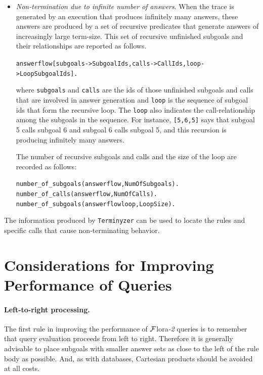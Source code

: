 \documentclass[11pt]{article}
\newcommand{\FLORA}{{\mbox{\sc ${\cal F}${lora}\rm\emph{-2}}}\xspace}
\newcommand{\FLSYSTEM}{\FLORA}
\begin{document}
{\begin{itemize}
\item \emph{Non-termination due to infinite number of answers}. 
  When the trace is generated by an execution that produces
  infinitely many answers, these answers are produced by a set of
  recursive predicates that generate answers of increasingly large
  term-size.
  This set of recursive unfinished subgoals and their relationships
  are reported as follows. 
\begin{alltt}
   answerflow[subgoals->SubgoalIds,calls->CallIds,loop->LoopSubgoalIds].
\end{alltt}
  where {\tt subgoals} and {\tt calls} are the ids of those unfinished
  subgoals and calls that are involved in answer generation 
  and {\tt loop} is the sequence of subgoal ids that form the
  recursive loop. 
  The {\tt loop} also indicates the call-relationship among the subgoals in
  the sequence. 
  For instance, {\tt [5,6,5]} says
  that subgoal 5 calls subgoal 6 and subgoal 6 calls subgoal 5, and
  this recursion is producing infinitely many answers. 

  The number of recursive subgoals and calls and the size of the loop
  are recorded as follows:
\begin{alltt}
   number\_of\_subgoals(answerflow,NumOfSubgoals).\\
   number\_of\_calls(answerflow,NumOfCalls).\\
   number\_of\_subgoals(answerflowloop,LoopSize).
\end{alltt}
\end{itemize}
The information produced by {\tt Terminyzer} can be used to locate
the rules and specific calls that cause
non-terminating behavior.
}

\section{Considerations for Improving Performance of Queries}

\paragraph{Left-to-right processing.}
The first rule in improving the performance of \FLSYSTEM queries is to
remember that query evaluation proceeds from left to right. Therefore it is
generally advisable to place subgoals with smaller answer sets as close to
the left of the rule body as possible. And, as with databases, Cartesian
products should be avoided at all costs.
\end{document}
